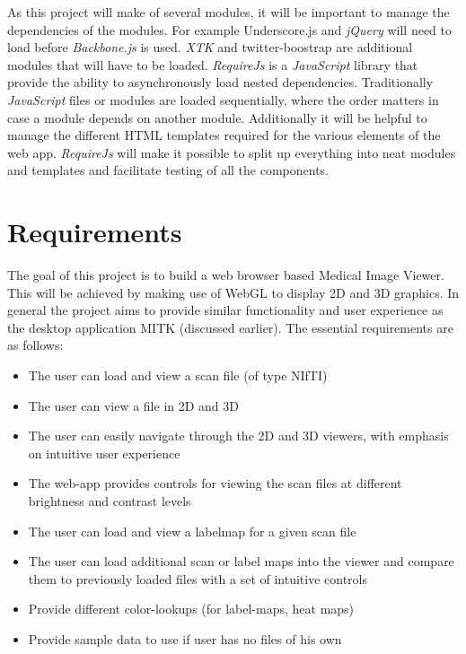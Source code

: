 \documentclass[a4paper,11pt,titlepage]{article}
\begin{document}
As this project will make of several modules, it will be important to manage the dependencies of the modules. For example Underscore.js and \textit{jQuery} will need to load before \textit{Backbone.js} is used. \textit{XTK} and twitter-boostrap are additional modules that will have to be loaded. \textit{RequireJs} is a \textit{JavaScript} library that provide the ability to asynchronously load nested dependencies. Traditionally \textit{JavaScript} files or modules are loaded sequentially, where the order matters in case a module depends on another module. Additionally it will be helpful to manage the different HTML templates required for the various elements of the web app. \textit{RequireJs} will make it possible to split up everything into neat modules and templates and facilitate testing of all the components.




\section{Requirements}

The goal of this project is to build a web browser based Medical Image Viewer. This will be achieved by making use of WebGL to display 2D and 3D graphics. In general the project aims to provide similar functionality and user experience as the desktop application MITK (discussed earlier). The essential requirements are as follows:

\begin{itemize}
\item The user can load and view a scan file (of type NIfTI)
\item The user can view a file in 2D and 3D
\item The user can easily navigate through the 2D and 3D viewers, with emphasis on intuitive user experience
\item The web-app provides controls for viewing the scan files at different brightness and contrast levels
\item The user can load and view a labelmap for a given scan file
\item The user can load additional scan or label maps into the viewer and compare them to previously loaded files with a set of intuitive controls
\item Provide different color-lookups (for label-maps, heat maps)
\item Provide sample data to use if user has no files of his own
\end{itemize}
\end{document}
